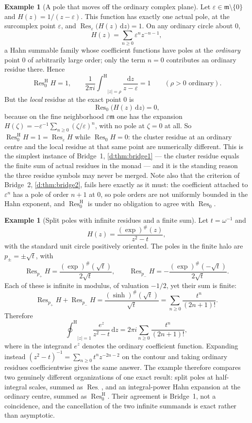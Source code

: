 \documentclass[11pt,a4paper]{article}
\numberwithin{equation}{section}
\theoremstyle{definition}
\newtheorem{example}[theorem]{Example}
\theoremstyle{remark}
\theoremstyle{plain}
\newcommand{\mm}{\mathfrak m}
\newcommand{\ev}[1]{#1^{\#}}
\newcommand{\intH}{{\int^{\mathrm H}}}
\newcommand{\ointH}{{\oint^{\mathrm H}}}
\DeclareMathOperator{\Res}{Res}                 %
\newcommand{\ResH}[1]{\Res^{\mathrm H}_{#1}}    %
\newcommand{\Resat}[1]{\Res_{#1}}               %
\newcommand{\abs}[1]{\lvert #1\rvert}
\newcommand{\dd}{\mathrm d}
\begin{document}
\begin{example}[A pole that moves off the ordinary complex
plane]\label{f:ex-movingpole}
Let $\varepsilon\in\mm\setminus\{0\}$ and
$H(z)=1/(z-\varepsilon)$.  This function has exactly one actual pole,
at the surcomplex point $\varepsilon$, and
$\Resat{\varepsilon}\bigl(H(z)\,\dd z\bigr)=1$.  On any ordinary circle
about $0$,
\[
 H(z)=\sum_{n\ge0}\varepsilon^{n}z^{-n-1},
\]
a Hahn summable family whose coefficient functions have poles at the
\emph{ordinary} point $0$ of arbitrarily large order; only the term
$n=0$ contributes an ordinary residue there.  Hence
\[
 \ResH{0}H=1,\qquad
 \frac1{2\pi i}\intH_{\abs z=\rho}\frac{\dd z}{z-\varepsilon}=1
 \qquad(\rho>0\text{ ordinary}).
\]
But the \emph{local} residue at the exact point $0$ is
\[
 \Resat{0}\bigl(H(z)\,\dd z\bigr)=0,
\]
because on the fine neighborhood $\varepsilon\mm$ one has the expansion
$H(\zeta)=-\varepsilon^{-1}\sum_{n\ge0}(\zeta/\varepsilon)^{n}$, with no
pole at $\zeta=0$ at all.  So
$\ResH{0}H=1=\Resat{\varepsilon}H$ while $\Resat{0}H=0$: the cluster
residue at an ordinary centre and the local residue at that same point
are numerically different.  This is the simplest instance of Bridge~1,
\ref{d:thm:bridge1} --- the cluster residue equals the finite sum of
actual residues in the monad --- and it is the standing reason the three
residue symbols may never be merged.  Note also that the criterion of
Bridge~2, \ref{d:thm:bridge2}, fails here exactly as it must: the
coefficient attached to $\varepsilon^{n}$ has a pole of order $n+1$ at
$0$, so pole orders are not uniformly bounded in the Hahn exponent, and
$\ResH{0}$ is under no obligation to agree with $\Resat{0}$.
\end{example}

\begin{example}[Split poles with infinite residues and a finite
sum]\label{f:ex-splitpoles}
Let $t=\omega^{-1}$ and
\[
 H(z)=\frac{\ev{(\exp)}(z)}{z^{2}-t},
\]
with the standard unit circle positively oriented.  The poles in the
finite halo are $p_{\pm}=\pm\sqrt t$, with
\[
 \Resat{p_{+}}H=\frac{\ev{(\exp)}(\sqrt t)}{2\sqrt t},
 \qquad
 \Resat{p_{-}}H=-\frac{\ev{(\exp)}(-\sqrt t)}{2\sqrt t}.
\]
Each of these is infinite in modulus, of valuation $-1/2$, yet their sum
is finite:
\[
 \Resat{p_{+}}H+\Resat{p_{-}}H
 =\frac{\ev{(\sinh)}(\sqrt t)}{\sqrt t}
 =\sum_{n\ge0}\frac{t^{n}}{(2n+1)!}.
\]
Therefore
\begin{equation}\label{f:eq-splitresidue}
 \ointH_{\abs z=1}\frac{e^{z}}{z^{2}-t}\,\dd z
 =2\pi i\sum_{n\ge0}\frac{t^{n}}{(2n+1)!},
\end{equation}
where in the integrand $e^{z}$ denotes the ordinary coefficient
function.  Expanding instead $(z^{2}-t)^{-1}=\sum_{n\ge0}t^{n}z^{-2n-2}$
on the contour and taking ordinary residues coefficientwise gives the
same answer.  The example therefore compares two genuinely different
organizations of one exact result: split poles at half-integral scales,
summed as $\Resat{\cdot}$, and an integral-power Hahn expansion at the
ordinary centre, summed as $\ResH{0}$.  Their agreement is Bridge~1,
not a coincidence, and the cancellation of the two infinite summands is
exact rather than asymptotic.
\end{example}
\end{document}
